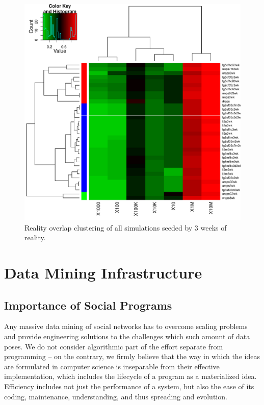 \documentclass[10pt,oneside]{memoir}
\begin{document}
\begin{figure}
\begin{center}
    \includegraphics{figures/heatmap-overx-dreps-medians-3wk}
    \caption{Reality overlap clustering of all simulations seeded by 3 weeks of reality.}
    \label{figure:heatmap-overx-dreps-medians-3wk}
\end{center}
\end{figure}
\pagebreak \chapter{Data Mining Infrastructure}
\label{datamininginfrastructure}

\section{Importance of Social Programs}
\label{importanceofsocialprograms}

Any massive data mining of social networks has to overcome scaling problems and provide engineering solutions to the challenges which such amount of data poses.  We do not consider algorithmic part of the effort separate from programming -- on the contrary, we firmly believe that the way in which the ideas are formulated in computer science is inseparable from their effective implementation, which includes the lifecycle of a program as a materialized idea.  Efficiency includes not just the performance of a system, but also the ease of its coding, maintenance, understanding, and thus spreading and evolution.
\end{document}

